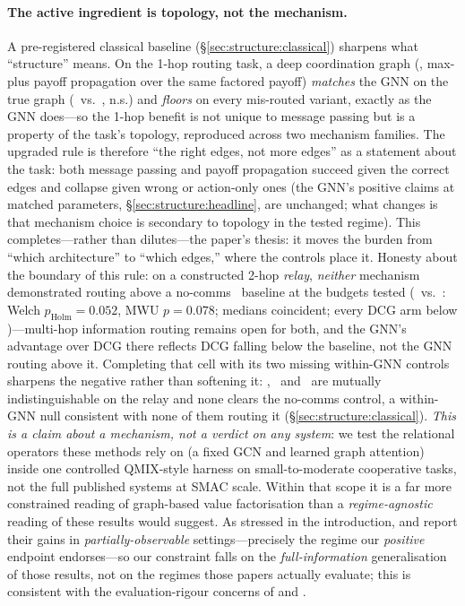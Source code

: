 \paragraph{The active ingredient is topology, not the mechanism.} A
pre-registered classical baseline (\S\ref{sec:structure:classical}) sharpens
what ``structure'' means. On the 1-hop routing task, a deep coordination graph
(, max-plus payoff propagation over the same factored payoff)
\emph{matches} the GNN on the true graph (\CBBdcgtrue\ vs.\ \SCkTrue, n.s.) and
\emph{floors} on every mis-routed variant, exactly as the GNN does---so the
1-hop benefit is not unique to message passing but is a property of the task's
topology, reproduced across two mechanism families. The upgraded rule is
therefore ``the right edges, not more edges'' as a statement about the task:
both message passing and payoff propagation succeed given the correct edges and
collapse given wrong or action-only ones (the GNN's positive claims at matched
parameters, \S\ref{sec:structure:headline}, are unchanged; what changes is that
mechanism choice is secondary to topology in the tested regime). This
completes---rather than dilutes---the paper's thesis: it moves the burden from
``which architecture'' to ``which edges,'' where the controls place it.
Honesty about the boundary of this rule: on a constructed 2-hop \emph{relay},
\emph{neither} mechanism demonstrated routing above a no-comms \mlpqmix\
baseline at the budgets tested (\gtrue\ vs.\ \mlpqmix: Welch
$p_{\text{Holm}}{=}0.052$, MWU $p{=}0.078$; medians coincident; every DCG arm
below \mlpqmix)---multi-hop information routing remains open for both, and the
GNN's advantage over DCG there reflects DCG falling below the baseline, not the
GNN routing above it. Completing that cell with its two missing within-GNN
controls sharpens the negative rather than softening it: \gtrue, \gwrong\ and
\gcomplete\ are mutually indistinguishable on the relay and none clears the
no-comms control, a within-GNN null consistent with none of them routing it
(\S\ref{sec:structure:classical}).
\emph{This is a claim about a mechanism, not a verdict on any system}: we
test the relational operators these methods rely on (a fixed GCN and learned
graph attention) inside one controlled QMIX-style harness on
small-to-moderate cooperative tasks, not the full published systems at SMAC
scale. Within that scope it is a far more constrained reading of graph-based
value factorisation than a
\emph{regime-agnostic} reading of these results
\citep{jiang_2020_dgn,liu_2020_g2anet,naderializadeh_2020_graphmix}
would suggest. As stressed in the introduction, \algoname{DGN} and
\algoname{G2ANet} report their gains in \emph{partially-observable}
settings---precisely
the regime our \emph{positive} endpoint endorses---so our constraint falls on
the \emph{full-information} generalisation of those results, not on the
regimes those papers actually evaluate; this is consistent with the
evaluation-rigour concerns of
\citet{henderson_2018_drlmatters} and \citet{agarwal_2021_precipice}.

